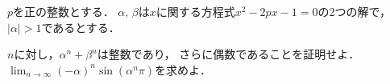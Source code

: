 \documentclass[../../main.tex]{subfiles}
\begin{document}
$p$を正の整数とする．
$\alpha, \, \beta$は$x$に関する方程式$x^2-2px-1=0$の2つの解で，
$|\alpha|>1$であるとする．
\begin{enumerate}
  $n$に対し，$\alpha^n+\beta^n$は整数であり，
    さらに偶数であることを証明せよ．
  $\displaystyle\lim_{n\to\infty}{(-\alpha)}^n\sin(\alpha^n\pi)$を求めよ．
\end{enumerate}
\end{document}
